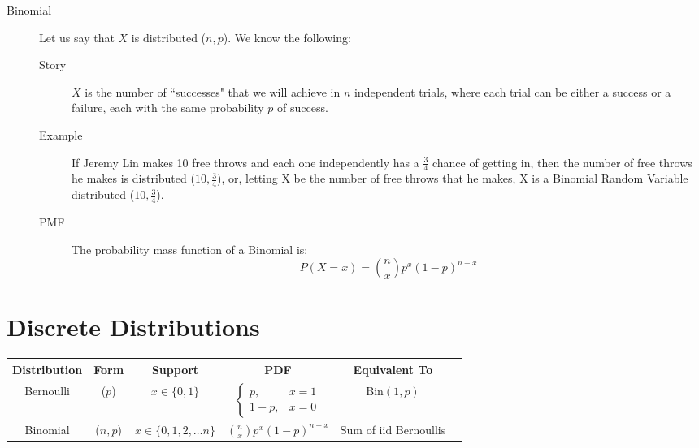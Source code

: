 \documentclass[11pt]{article}
\theoremstyle{definition}
\theoremstyle{remark}
\newcommand{\Bin}{\text{Bin}}
\newcommand{\Bern}{\text{Bern}}
\begin{document}
\begin{description}

\item[Binomial] Let us say that $X$ is distributed \Bin($n,p$). We know the following:
\begin{description}
	\item[Story] $X$ is the number of ``successes" that we will achieve in $n$ independent trials, where each trial can be either a success or a failure, each with the same probability $p$ of success.
	\item[Example] If Jeremy Lin makes 10 free throws and each one independently has a $\frac{3}{4}$ chance of getting in, then the number of free throws he makes is distributed  \Bin($10,\frac{3}{4}$), or, letting X be the number of free throws that he makes, X is a Binomial Random Variable distributed  \Bin($10,\frac{3}{4}$).
	\item[PMF] The probability mass function of a Binomial is:
\[P(X = x) = \binom{n}{x} p^x(1-p)^{n-x}\]
\end{description}
\end{description}

\section{Discrete Distributions}
\begin{center}
\renewcommand{\arraystretch}{3}
\begin{tabular}{cccccc}
\textbf{Distribution} & \textbf{Form} & \textbf{Support} & \textbf{PDF} & \textbf{Equivalent To}\\
\hline
Bernoulli & \Bern($p$) & $x \in \{0, 1\}$ &$\begin{cases} p, & x = 1 \\ 1-p, & x = 0 \end{cases}$ & $\Bin(1, p)$ \\
Binomial & \Bin($n, p$) & $x \in \{0, 1, 2, \dots n \}$ & $\binom{n}{x} p^x(1-p)^{n-x}$ & Sum of iid Bernoullis \\
\end{tabular}
\end{center}

\pagebreak
\end{document}
